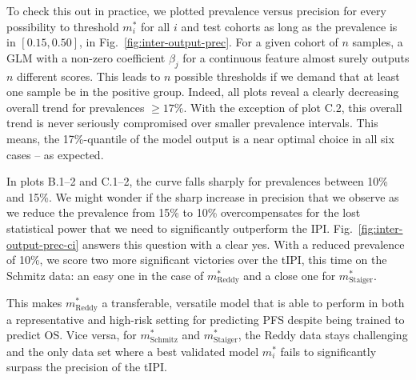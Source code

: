 To check this out in practice, we plotted prevalence versus precision for every possibility to 
threshold $m^*_i$ for all $i$ and test cohorts as long as the prevalence is in $[\num{0.15}, 
\num{0.50}]$, in Fig.\ \ref{fig:inter-output-prec}. For a given 
cohort of $n$ samples, a GLM with a non-zero coefficient $\beta_j$ for a continuous feature almost 
surely outputs $n$ different scores. This leads to $n$ possible thresholds if we demand that at 
least one sample be in the positive group. Indeed, all 
plots reveal a clearly decreasing overall trend for prevalences $\geq \num{17}\%$. With the 
exception of plot C.2, this overall trend is never seriously compromised over smaller 
prevalence intervals. This means, the \num{17}\%-quantile of the model output is a near optimal 
choice in all six cases -- as expected.

In plots B.1--2 and C.1--2, the curve falls sharply for prevalences between \num{10}\% and \num{15}\%. 
We might wonder if the sharp increase in precision that we observe as we reduce the prevalence 
from \num{15}\% to \num{10}\% overcompensates for the lost statistical power that we need to 
significantly outperform the IPI. Fig.\ \ref{fig:inter-output-prec-ci} answers this question with a 
clear yes. With a reduced prevalence of \num{10}\%, we score two more significant victories over the 
tIPI, this time on the Schmitz data: an easy one in the case of $m^*_\text{Reddy}$ and a close one
for $m^*_\text{Staiger}$. 

This makes $m^*_\text{Reddy}$ a transferable, versatile model that is 
able to perform in both a representative and high-risk setting for predicting PFS despite being 
trained to predict OS. Vice versa, for $m^*_\text{Schmitz}$ and $m^*_\text{Staiger}$, the Reddy data 
stays challenging and the only data set where a best validated model $m^*_i$ fails to significantly 
surpass the precision of the tIPI.